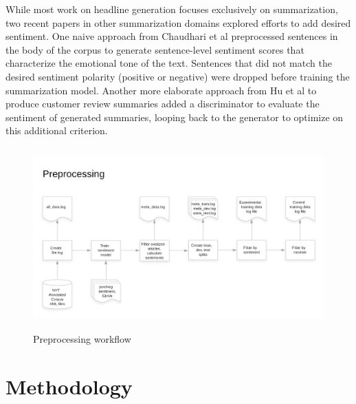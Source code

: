 \documentclass[11pt]{article}
\begin{document}
While most work on headline generation focuses exclusively on summarization, two recent papers in other summarization domains explored efforts to add desired sentiment. One naive approach from Chaudhari et al \cite{DBLP:journals/corr/abs-1802-09426} preprocessed sentences in the body of the corpus to generate sentence-level sentiment scores that characterize the emotional tone of the text. Sentences that did not match the desired sentiment polarity (positive or negative) were dropped before training the summarization model. Another more elaborate approach from Hu et al \cite{DBLP:journals/corr/HuYLSX17} to produce customer review summaries added a discriminator to evaluate the sentiment of generated summaries, looping back to the generator to optimize on this additional criterion. 


\begin{figure}
  \includegraphics[width=\textwidth,height=7cm]{Headgen_prep.png}
  \caption{Preprocessing workflow}
\end{figure}

\section{Methodology}
\end{document}
